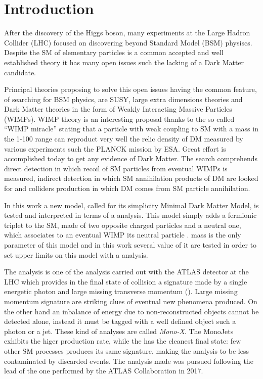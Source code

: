 \chapter{Introduction}
\lettrine{A}{}fter the discovery of the Higgs boson, many experiments at the Large Hadron Collider (LHC) focused on discovering beyond Standard Model (BSM) physiscs. Despite the SM of elementary particles is a common accepted and well established theory it has many open issues such the lacking of a Dark Matter candidate.
  
Principal theories proposing to solve this open issues having the common feature, of searching for BSM physics, are SUSY, large extra dimensions theories and Dark Matter theories in the form of Weakly Interacting Massive Particles (WIMPs). WIMP theory is an interesting proposal thanks to the so called ``WIMP miracle'' stating that a particle with weak coupling to SM with a mass in the \SI{1}{\gev}-\SI{100}{\gev} range can reproduct very well the relic density of DM measured by various experiments such the PLANCK mission by ESA. Great effort is accomplished today to get any evidence of Dark Matter. The search comprehends direct detection in which recoil of SM particles from eventual WIMPs is measured, indirect detection in which SM annihilation products of DM are looked for and colliders production in which DM comes from SM particle annihilation.

In this work a new model, called for its simplicity Minimal Dark Matter Model, is tested and interpreted in terms of a \mph analysis. This model simply adds a fermionic triplet to the SM, made of two opposite charged particles \chipm and a neutral one, which associates to an eventual WIMP its neutral particle \chizero. \chizero mass is the only parameter of this model and in this work several value of it are tested in order to set upper limits on this model with a \mph analysis.

The \mph analysis is one of the analysis carried out with the ATLAS detector at the LHC which provides in the final state of \pp collision a signature made by a single energetic photon and large missing transverse momentum (\met). Large missing momentum signature are striking clues of eventual new phenomena produced. On the other hand an inbalance of energy due to non-reconstructed objects cannot be detected alone, instead it must be tagged with a well defined object such a photon or a jet. These kind of analyses are called \emph{Mono-X}. The MonoJets exhibits the higer production rate, while the \mph has the cleanest final state: few other SM processes produces its same signature, making the \mph analysis to be less contaminated by discarded events. The analysis made was pursued following the lead of the one performed by the ATLAS Collaboration in 2017.

